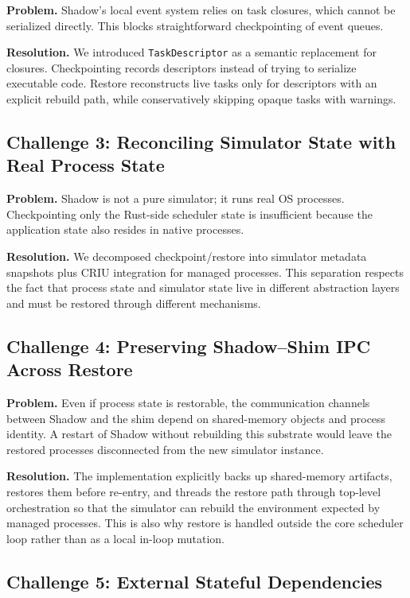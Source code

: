 \documentclass[11pt,a4paper]{article}
\begin{document}
\textbf{Problem.}
Shadow's local event system relies on task closures, which cannot be
serialized directly. This blocks straightforward checkpointing of event queues.

\textbf{Resolution.}
We introduced \texttt{TaskDescriptor} as a semantic replacement for closures.
Checkpointing records descriptors instead of trying to serialize executable
code. Restore reconstructs live tasks only for descriptors with an explicit
rebuild path, while conservatively skipping opaque tasks with warnings.

\subsection{Challenge 3: Reconciling Simulator State with Real Process State}

\textbf{Problem.}
Shadow is not a pure simulator; it runs real OS processes. Checkpointing only
the Rust-side scheduler state is insufficient because the application state
also resides in native processes.

\textbf{Resolution.}
We decomposed checkpoint/restore into simulator metadata snapshots plus CRIU
integration for managed processes. This separation respects the fact that
process state and simulator state live in different abstraction layers and
must be restored through different mechanisms.

\subsection{Challenge 4: Preserving Shadow--Shim IPC Across Restore}

\textbf{Problem.}
Even if process state is restorable, the communication channels between Shadow
and the shim depend on shared-memory objects and process identity. A restart of
Shadow without rebuilding this substrate would leave the restored processes
disconnected from the new simulator instance.

\textbf{Resolution.}
The implementation explicitly backs up shared-memory artifacts, restores them
before re-entry, and threads the restore path through top-level orchestration
so that the simulator can rebuild the environment expected by managed
processes. This is also why restore is handled outside the core scheduler loop
rather than as a local in-loop mutation.

\subsection{Challenge 5: External Stateful Dependencies}
\end{document}
